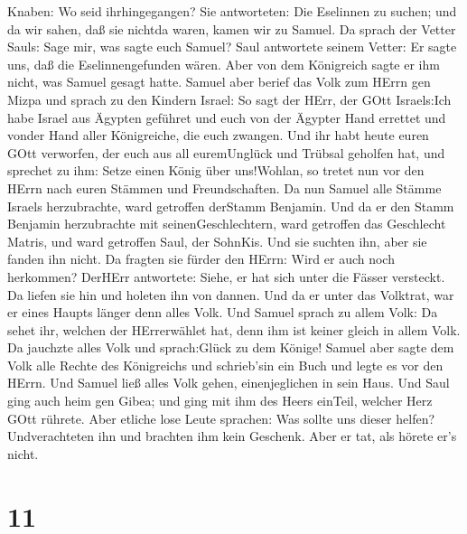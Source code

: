 Knaben: Wo seid ihrhingegangen? Sie antworteten: Die Eselinnen zu
suchen; und da wir sahen, daß sie nichtda waren, kamen wir zu Samuel.
 Da sprach der Vetter Sauls: Sage mir, was sagte euch
Samuel?  Saul antwortete seinem Vetter: Er sagte uns, daß
die Eselinnengefunden wären. Aber von dem Königreich sagte er ihm nicht,
was Samuel gesagt hatte.  Samuel aber berief das Volk zum
HErrn gen Mizpa  und sprach zu den Kindern Israel: So sagt
der HErr, der GOtt Israels:Ich habe Israel aus Ägypten geführet und euch
von der Ägypter Hand errettet und vonder Hand aller Königreiche, die
euch zwangen.  Und ihr habt heute euren GOtt verworfen, der
euch aus all euremUnglück und Trübsal geholfen hat, und sprechet zu ihm:
Setze einen König über uns!Wohlan, so tretet nun vor den HErrn nach
euren Stämmen und Freundschaften.  Da nun Samuel alle
Stämme Israels herzubrachte, ward getroffen derStamm Benjamin.
 Und da er den Stamm Benjamin herzubrachte mit
seinenGeschlechtern, ward getroffen das Geschlecht Matris, und ward
getroffen Saul, der SohnKis. Und sie suchten ihn, aber sie fanden ihn
nicht.  Da fragten sie fürder den HErrn: Wird er auch noch
herkommen? DerHErr antwortete: Siehe, er hat sich unter die Fässer
versteckt.  Da liefen sie hin und holeten ihn von dannen.
Und da er unter das Volktrat, war er eines Haupts länger denn alles
Volk.  Und Samuel sprach zu allem Volk: Da sehet ihr,
welchen der HErrerwählet hat, denn ihm ist keiner gleich in allem Volk.
Da jauchzte alles Volk und sprach:Glück zu dem Könige! 
Samuel aber sagte dem Volk alle Rechte des Königreichs und schrieb'sin
ein Buch und legte es vor den HErrn. Und Samuel ließ alles Volk gehen,
einenjeglichen in sein Haus.  Und Saul ging auch heim gen
Gibea; und ging mit ihm des Heers einTeil, welcher Herz GOtt rührete.
 Aber etliche lose Leute sprachen: Was sollte uns dieser
helfen? Undverachteten ihn und brachten ihm kein Geschenk. Aber er tat,
als hörete er's nicht.

\hypertarget{section-10}{%
\section{11}\label{section-10}}

